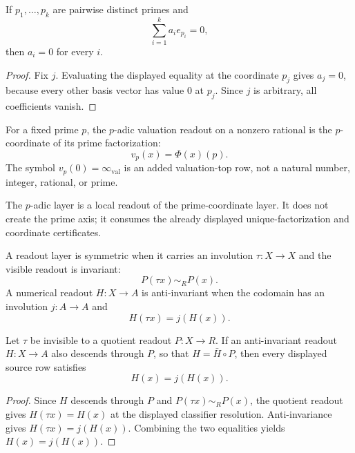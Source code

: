 \begin{theorem}
\label{thm:layered-projection-prime-axis-independence}
If $p_1,\ldots,p_k$ are pairwise distinct primes and
$$
\sum_{i=1}^{k}a_i e_{p_i}=0,
$$
then $a_i=0$ for every $i$.
\end{theorem}

\begin{proof}
Fix $j$. Evaluating the displayed equality at the coordinate $p_j$ gives
$a_j=0$, because every other basis vector has value $0$ at $p_j$. Since
$j$ is arbitrary, all coefficients vanish.
\end{proof}

\begin{definition}
\label{def:layered-projection-p-adic-local-readout}
For a fixed prime $p$, the $p$-adic valuation readout on a nonzero
rational is the $p$-coordinate of its prime factorization:
$$
v_p(x)=\Phi(x)(p).
$$
The symbol $v_p(0)=\infty_{\mathrm{val}}$ is an added valuation-top row,
not a natural number, integer, rational, or prime.
\end{definition}

\begin{principle}
\label{prin:layered-projection-prime-axis-locality}
The $p$-adic layer is a local readout of the prime-coordinate layer. It
does not create the prime axis; it consumes the already displayed
unique-factorization and coordinate certificates.
\end{principle}

\begin{definition}
\label{def:layered-projection-symmetric-readout-layer}
A readout layer is symmetric when it carries an involution
$\tau:X\to X$ and the visible readout is invariant:
$$
P(\tau x)\sim_R P(x).
$$
A numerical readout $H:X\to A$ is anti-invariant when the codomain has an
involution $j:A\to A$ and
$$
H(\tau x)=j(H(x)).
$$
\end{definition}

\begin{theorem}
\label{thm:layered-projection-quotient-fixed-point}
Let $\tau$ be invisible to a quotient readout $P:X\to R$. If an
anti-invariant readout $H:X\to A$ also descends through $P$, so that
$H=\bar H\circ P$, then every displayed source row satisfies
$$
H(x)=j(H(x)).
$$
\end{theorem}

\begin{proof}
Since $H$ descends through $P$ and $P(\tau x)\sim_R P(x)$, the quotient
readout gives $H(\tau x)=H(x)$ at the displayed classifier resolution.
Anti-invariance gives $H(\tau x)=j(H(x))$. Combining the two equalities
yields $H(x)=j(H(x))$.
\end{proof}

